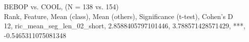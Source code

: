 BEBOP vs. COOL, (N = 138 vs. 154)\\
Rank, Feature, Mean (class), Mean (others), Significance (t-test), Cohen's D\\
12, ric_mean_seg_len_02_short, 2.8588405797101446, 3.788571428571429, ***, -0.5465311075081348\\
